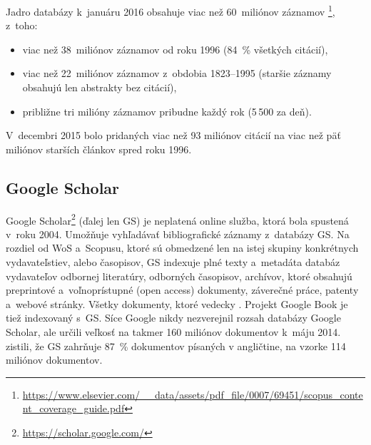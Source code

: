 Jadro databázy k~januáru 2016 obsahuje viac než 60~miliónov záznamov%
\footnote{\url{https://www.elsevier.com/__data/assets/pdf_file/0007/69451/scopus_content_coverage_guide.pdf}}, z~toho:

\begin{itemize}
\item viac než 38~miliónov záznamov od roku 1996 (84~\% všetkých citácií),
\item viac než 22~miliónov záznamov z~obdobia 1823--1995 (staršie záznamy
  obsahujú len abstrakty bez citácií),
\item približne tri milióny záznamov pribudne každý rok (5\,500 za deň).
\end{itemize}

V~decembri 2015 bolo pridaných viac než 93 miliónov citácií na viac než päť
miliónov starších článkov spred roku 1996.

\subsection{Google Scholar}
\label{sec:gs}

Google Scholar\footnote{\url{https://scholar.google.com/}} (ďalej len GS) je
neplatená online služba, ktorá bola spustená v~roku 2004.  Umožňuje vyhľadávať
bibliografické záznamy z~databázy GS.  Na rozdiel od WoS a~Scopusu, ktoré sú
obmedzené len na istej skupiny konkrétnych vydavateľstiev, alebo časopisov, GS
indexuje plné texty a~metadáta databáz vydavateľov odbornej literatúry,
odborných časopisov, archívov, ktoré obsahujú preprintové a~voľnoprístupné (open
access) dokumenty, záverečné práce, patenty a~webové stránky.  Všetky dokumenty,
ktoré  vedecky \citep{Vine2006}.  Projekt Google Book je tiež
indexovaný s~GS.  Síce Google nikdy nezverejnil rozsah databázy Google Scholar,
ale \citet{Orduna-Malea2015} určili veľkosť na takmer 160 miliónov dokumentov
k~máju 2014.  \citet{Khabsa2014} zistili, že GS zahrňuje 87~\% dokumentov
písaných v angličtine, na vzorke 114 miliónov dokumentov.

